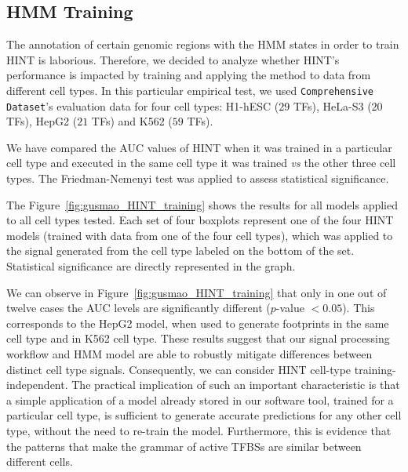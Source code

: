 \subsection{HMM Training}
\label{sec:ps.hmm.training}

The annotation of certain genomic regions with the HMM states in order to train HINT is laborious. Therefore, we decided to analyze whether HINT's performance is impacted by training and applying the method to data from different cell types. In this particular empirical test, we used {\tt Comprehensive Dataset}'s evaluation data for four cell types: H1-hESC ($29$ TFs), HeLa-S3 ($20$ TFs), HepG2 ($21$ TFs) and K562 ($59$ TFs).

We have compared the AUC values of HINT when it was trained in a particular cell type and executed in the same cell type it was trained \emph{vs} the other three cell types. The Friedman-Nemenyi test was applied to assess statistical significance.

The Figure~\ref{fig:gusmao_HINT_training} shows the results for all models applied to all cell types tested. Each set of four boxplots represent one of the four HINT models (trained with data from one of the four cell types), which was applied to the signal generated from the cell type labeled on the bottom of the set. Statistical significance are directly represented in the graph.

We can observe in Figure~\ref{fig:gusmao_HINT_training} that only in one out of twelve cases the AUC levels are significantly different ($p$-value $< 0.05$). This corresponds to the HepG2 model, when used to generate footprints in the same cell type and in K562 cell type. These results suggest that our signal processing workflow and HMM model are able to robustly mitigate differences between distinct cell type signals. Consequently, we can consider HINT cell-type training-independent. The practical implication of such an important characteristic is that a simple application of a model already stored in our software tool, trained for a particular cell type, is sufficient to generate accurate predictions for any other cell type, without the need to re-train the model. Furthermore, this is evidence that the patterns that make the grammar of active TFBSs are similar between different cells.

